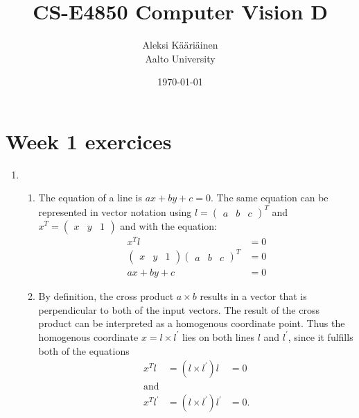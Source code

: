 \documentclass[11pt,a4paper]{article}
\title{CS-E4850 Computer Vision D}
\author{Aleksi Kääriäinen  \\
	Aalto University  \\
	}
\begin{document}
\date{\today}

\maketitle

\newpage

\section*{Week 1 exercices}

\begin{enumerate}
      \item

            \begin{enumerate}

                  \item The equation of a line is $ax + by + c = 0$. The same equation can be represented in vector notation using $l = \begin{pmatrix}
                                    a & b & c
                              \end{pmatrix}^T$ and $x^T = \begin{pmatrix}
                                    x & y & 1
                              \end{pmatrix}$ and with the equation:
                        \begin{align*}
                              x^T l                         & = 0 \\
                              \begin{pmatrix}
                                    x & y & 1
                              \end{pmatrix} \begin{pmatrix}
                                                  a & b & c
                                            \end{pmatrix}^T & = 0 \\
                              ax + by + c                   & = 0
                        \end{align*}

                  \item By definition, the cross product $a \times b$ results in a vector that is perpendicular to
                        both of the input vectors. The result of the cross product can be interpreted as a homogenous coordinate point.
                        Thus the homogenous coordinate $x = l \times l^\prime$ lies on both lines $l$ and $l^\prime$, since it
                        fulfills both of the equations
                        \begin{align*}
                              x^T l          & = (l \times l^\prime)l        & = 0  \\
                              \text{and}                                            \\
                              x^T l^{\prime} & = (l \times l^\prime)l^\prime & = 0.
                        \end{align*}


\end{enumerate}
\end{enumerate}
\end{document}
